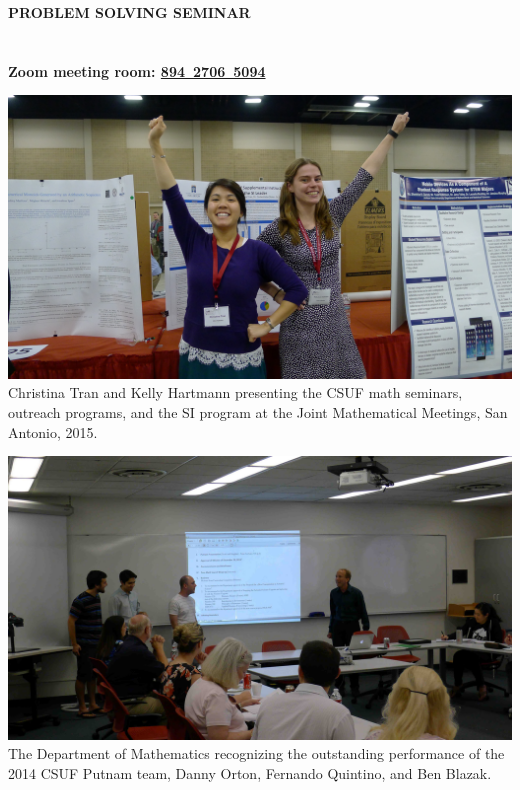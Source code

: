 \documentclass[a4paper]{article}
\begin{document}
\thispagestyle{empty}


\newcommand{\name}[1]{\textit{#1}}

\raggedbottom
\begin{minipage}{0.95\textwidth}
\sffamily
\centering
\LARGE{\color{csecondary}\bf PROBLEM SOLVING SEMINAR}\\

\Large{\color{cprimary}\textbf{}}\\

\large{\color{cprimary}\textbf{}}\\
\smallskip
\large{\color{cprimary}\textbf{{\color{csecondary}Zoom meeting room:} \href{https://fullerton.zoom.us/j/89427065094}{894\ 2706\ 5094}}}

\bigskip

\begin{minipage}[b]{0.47\textwidth}
\normalsize
\includegraphics[width=\linewidth]{SanAntonio.jpg}
Christina Tran and Kelly Hartmann presenting the CSUF math seminars, outreach programs, and the SI program at the Joint Mathematical Meetings, San Antonio, 2015.
\medskip\par
\includegraphics[width=\linewidth]{Ben.jpg}
The Department of Mathematics recognizing the outstanding performance of the 2014 CSUF Putnam team, Danny Orton, Fernando Quintino, and Ben Blazak.
\medskip
\medskip


\end{minipage}
\end{minipage}
\end{document}
